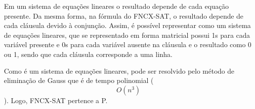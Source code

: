 \documentclass[12pt]{article}
\begin{document}
\begin{enumerate}
{	Em um sistema de equações lineares o resultado depende de cada equação presente. Da mesma forma, na fórmula do FNCX-SAT, o resultado depende de cada cláusula devido à conjunção. Assim, é possível representar como um sistema de equações lineares, que se representado em forma matricial possui 1s para cada variável presente e 0s para cada variável ausente na cláusula e o resultado como 0 ou 1, sendo que cada cláusula corresponde a uma linha.

	Como é um sistema de equações lineares, pode ser resolvido pelo método de eliminação de Gauss que é de tempo polinomial ($$O(n^3)$$). Logo, FNCX-SAT pertence a P.
}
\end{enumerate}
\end{document}
